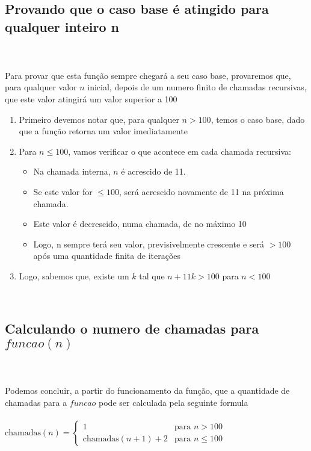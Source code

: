 \documentclass[11pt,reqno,a4paper]{amsart}
\begin{document}
\subsection{Provando que o caso base é atingido para qualquer inteiro n}
\
\\
\\
Para provar que esta função sempre chegará a seu caso base, provaremos que, para qualquer valor $n$ inicial, depois de um numero finito de chamadas recursivas, que este valor atingirá um valor superior a 100
\begin{enumerate}
    \item Primeiro devemos notar que, para qualquer $ n > 100 $, temos o caso base, dado que a função retorna um valor imediatamente
    \item Para $n \leq 100$, vamos verificar o que acontece em cada chamada recursiva:
    \begin{itemize}
        \item Na chamada interna, $n$ é acrescido de 11.
        \item Se este valor for $\leq 100$, será acrescido novamente de 11 na próxima chamada.
        \item Este valor é decrescido, numa chamada, de no máximo 10
        \item Logo, n sempre terá seu valor, previsivelmente crescente e será $ > 100$ após uma quantidade finita de iterações
    \end{itemize}
    \item Logo, sabemos que, existe um $k$ tal que $n + 11k > 100$ para $n < 100$
\end{enumerate}
\\

\subsection{Calculando o numero de chamadas para $funcao(n)$}
\
\\
\\
Podemos concluir, a partir do funcionamento da função, que a quantidade de chamadas para a $funcao$ pode ser calculada pela seguinte formula
\\
\\
\begin{math}
    \text{chamadas}(n) = 
\begin{cases} 
1 & \text{para } n > 100 \\
\text{chamadas}(n + 1) + 2 & \text{para } n \leq 100
\end{cases}
\end{math}
\end{document}
